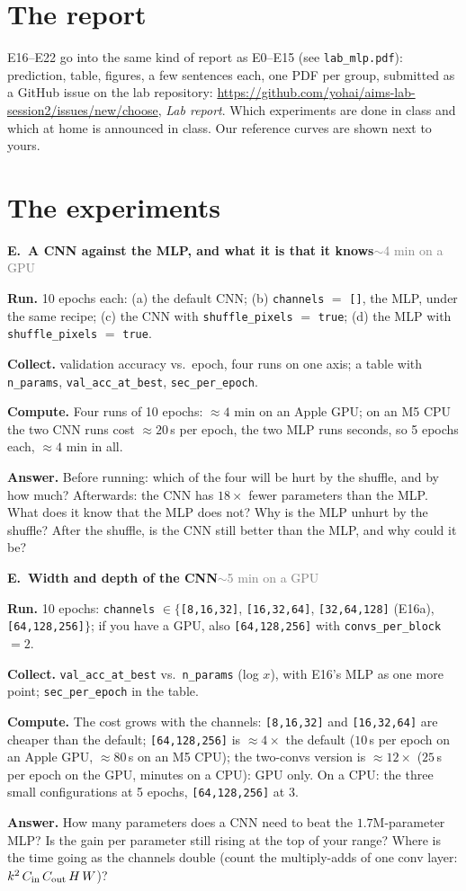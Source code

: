 \documentclass[11pt]{article}
\newcommand{\code}[1]{\texttt{#1}}
\newcounter{exp}
\newenvironment{experiment}[2]{\refstepcounter{exp}\par\medskip
  \textbf{\textcolor{aiblue}{E\theexp.\ #1}}\hfill{\small\textcolor{gray}{#2}}\par}{\par}
\newcommand{\run}[1]{\textbf{Run.} #1\par}
\newcommand{\collect}[1]{\textbf{Collect.} #1\par}
\newcommand{\answer}[1]{\textbf{Answer.} #1\par}
\newcommand{\heavy}[1]{\textcolor{gray!70!black}{\textbf{Compute.} #1}\par}
\begin{document}
\section*{The report}
E16--E22 go into the same kind of report as E0--E15 (see \code{lab\_mlp.pdf}): prediction, table, figures, a few sentences each, one PDF per group, submitted as a GitHub issue on the lab repository: \url{https://github.com/yohai/aims-lab-session2/issues/new/choose}, \emph{Lab report}. Which experiments are done in class and which at home is announced in class. Our reference curves are shown next to yours.

\section*{The experiments}
\setcounter{exp}{15}

\begin{experiment}{A CNN against the MLP, and what it is that it knows}{$\sim$4 min on a GPU}
\run{10 epochs each: (a) the default CNN; (b) \code{channels} $=$ \code{[]}, the MLP, under the same recipe; (c) the CNN with \code{shuffle\_pixels} $=$ \code{true}; (d) the MLP with \code{shuffle\_pixels} $=$ \code{true}.}
\collect{validation accuracy vs.\ epoch, four runs on one axis; a table with \code{n\_params}, \code{val\_acc\_at\_best}, \code{sec\_per\_epoch}.}
\heavy{Four runs of 10 epochs: $\approx4$ min on an Apple GPU; on an M5 CPU the two CNN runs cost $\approx20$\,s per epoch, the two MLP runs seconds, so 5 epochs each, $\approx4$ min in all.}
\answer{Before running: which of the four will be hurt by the shuffle, and by how much? Afterwards: the CNN has $18\times$ fewer parameters than the MLP. What does it know that the MLP does not? Why is the MLP unhurt by the shuffle? After the shuffle, is the CNN still better than the MLP, and why could it be?}
\end{experiment}

\begin{experiment}{Width and depth of the CNN}{$\sim$5 min on a GPU}
\run{10 epochs: \code{channels} $\in\{$\code{[8,16,32]}, \code{[16,32,64]}, \code{[32,64,128]} (E16a), \code{[64,128,256]}$\}$; if you have a GPU, also \code{[64,128,256]} with \code{convs\_per\_block} $=2$.}
\collect{\code{val\_acc\_at\_best} vs.\ \code{n\_params} (log $x$), with E16's MLP as one more point; \code{sec\_per\_epoch} in the table.}
\heavy{The cost grows with the channels: \code{[8,16,32]} and \code{[16,32,64]} are cheaper than the default; \code{[64,128,256]} is $\approx4\times$ the default ($10$\,s per epoch on an Apple GPU, $\approx80$\,s on an M5 CPU); the two-convs version is $\approx12\times$ ($25$\,s per epoch on the GPU, minutes on a CPU): GPU only. On a CPU: the three small configurations at 5 epochs, \code{[64,128,256]} at 3.}
\answer{How many parameters does a CNN need to beat the $1.7$M-parameter MLP? Is the gain per parameter still rising at the top of your range? Where is the time going as the channels double (count the multiply-adds of one conv layer: $k^2\,C_{\rm in}\,C_{\rm out}\,H\,W$)?}
\end{experiment}
\end{document}
